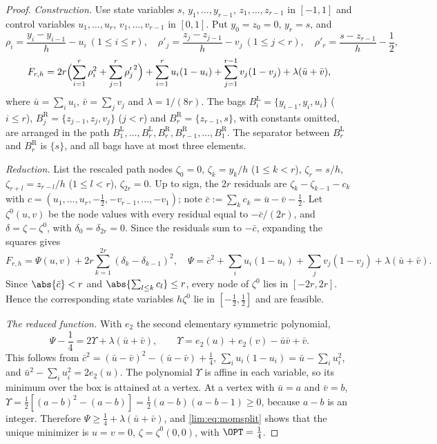 \begin{proof}
\emph{Construction.} Use state variables $s$, $y_1,\ldots,y_{r-1}$,
$z_1,\ldots,z_{r-1}$ in $[-1,1]$ and control variables $u_1,\ldots,u_r$,
$v_1,\ldots,v_{r-1}$ in $[0,1]$. Put $y_0=z_0=0$, $y_r=s$, and
\[
\rho_i=\frac{y_i-y_{i-1}}h-u_i\ (1\le i\le r),\quad
\rho'_j=\frac{z_j-z_{j-1}}h-v_j\ (1\le j<r),\quad
\rho'_r=\frac{s-z_{r-1}}h-\frac12,
\]
\[
F_{r,h}=2r\Bigl(\sum_{i=1}^r\rho_i^2+\sum_{j=1}^r{\rho'_j}^2\Bigr)
+\sum_{i=1}^ru_i(1-u_i)+\sum_{j=1}^{r-1}v_j(1-v_j)+\lambda(\bar u+\bar v),
\]
where $\bar u=\sum_iu_i$, $\bar v=\sum_jv_j$ and $\lambda=1/(8r)$. The bags
$B^{\mathrm L}_i=\{y_{i-1},y_i,u_i\}$ ($i\le r$),
$B^{\mathrm R}_j=\{z_{j-1},z_j,v_j\}$ ($j<r$) and
$B^{\mathrm R}_r=\{z_{r-1},s\}$, with constants omitted, are arranged in the
path $B^{\mathrm L}_1,\ldots,B^{\mathrm L}_r,B^{\mathrm R}_r,
B^{\mathrm R}_{r-1},\ldots,B^{\mathrm R}_1$. The separator between
$B^{\mathrm L}_r$ and $B^{\mathrm R}_r$ is $\{s\}$, and all bags have at most
three elements.

\emph{Reduction.} List the rescaled path nodes $\zeta_0=0$, $\zeta_k=y_k/h$
($1\le k<r$), $\zeta_r=s/h$, $\zeta_{r+l}=z_{r-l}/h$ ($1\le l<r$),
$\zeta_{2r}=0$. Up to sign, the $2r$ residuals are $\zeta_k-\zeta_{k-1}-c_k$
with $c=(u_1,\ldots,u_r,-\frac12,-v_{r-1},\ldots,-v_1)$; note
$\bar c:=\sum_kc_k=\bar u-\bar v-\frac12$. Let $\zeta^0(u,v)$ be the node values
with every residual equal to $-\bar c/(2r)$, and $\delta=\zeta-\zeta^0$, with
$\delta_0=\delta_{2r}=0$. Since the residuals sum to $-\bar c$, expanding the
squares gives
\begin{equation}\label{lim:eq:momsplit}
F_{r,h}=\Psi(u,v)+2r\sum_{k=1}^{2r}(\delta_k-\delta_{k-1})^2,\quad
\Psi=\bar c^2+\sum_iu_i(1-u_i)+\sum_jv_j(1-v_j)+\lambda(\bar u+\bar v).
\end{equation}
Since $\abs{\bar c}<r$ and $\abs{\sum_{l\le k}c_l}\le r$, every node of
$\zeta^0$ lies in $[-2r,2r]$. Hence the corresponding state variables
$h\zeta^0$ lie in $[-\tfrac12,\tfrac12]$ and are feasible.

\emph{The reduced function.} With $e_2$ the second elementary symmetric
polynomial,
\begin{equation}\label{lim:eq:pi}
\Psi-\frac14=2\Upsilon+\lambda(\bar u+\bar v),\qquad
\Upsilon=e_2(u)+e_2(v)-\bar u\bar v+\bar v .
\end{equation}
This follows from $\bar c^2=(\bar u-\bar v)^2-(\bar u-\bar v)+\frac14$,
$\sum_iu_i(1-u_i)=\bar u-\sum_iu_i^2$, and $\bar u^2-\sum_iu_i^2=2e_2(u)$. The
polynomial $\Upsilon$ is affine in each variable, so its minimum over the box
is attained at a vertex. At a vertex with $\bar u=a$ and $\bar v=b$,
$\Upsilon=\frac12[(a-b)^2-(a-b)]=\frac12(a-b)(a-b-1)\ge0$, because $a-b$ is an
integer. Therefore $\Psi\ge\frac14+\lambda(\bar u+\bar v)$, and
\eqref{lim:eq:momsplit} shows that the unique minimizer is $u=v=0$,
$\zeta=\zeta^0(0,0)$, with $\OPT=\frac14$.


\end{proof}
